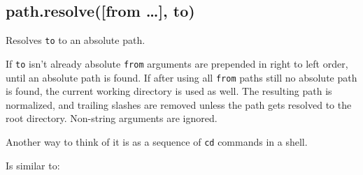 \begin{Shaded}
\begin{Highlighting}[]
\NormalTok{(}\NormalTok{, }\NormalTok{, }\NormalTok{, }\NormalTok{, }\NormalTok{)}

\NormalTok{(}\NormalTok{, \{\}, }\NormalTok{)}
   
\end{Highlighting}
\end{Shaded}

\subsection{path.resolve({[}from \ldots{}{]},
to)}\label{path.resolvefrom-to}

Resolves \texttt{to} to an absolute path.

If \texttt{to} isn't already absolute \texttt{from} arguments are
prepended in right to left order, until an absolute path is found. If
after using all \texttt{from} paths still no absolute path is found, the
current working directory is used as well. The resulting path is
normalized, and trailing slashes are removed unless the path gets
resolved to the root directory. Non-string arguments are ignored.

Another way to think of it is as a sequence of \texttt{cd} commands in a
shell.

\begin{Shaded}
\begin{Highlighting}[]
\NormalTok{(}\NormalTok{, }\NormalTok{, }\NormalTok{, }\NormalTok{)}
\end{Highlighting}
\end{Shaded}

Is similar to:

\begin{Shaded}
\begin{Highlighting}[]
 
\end{Highlighting}
\end{Shaded}

